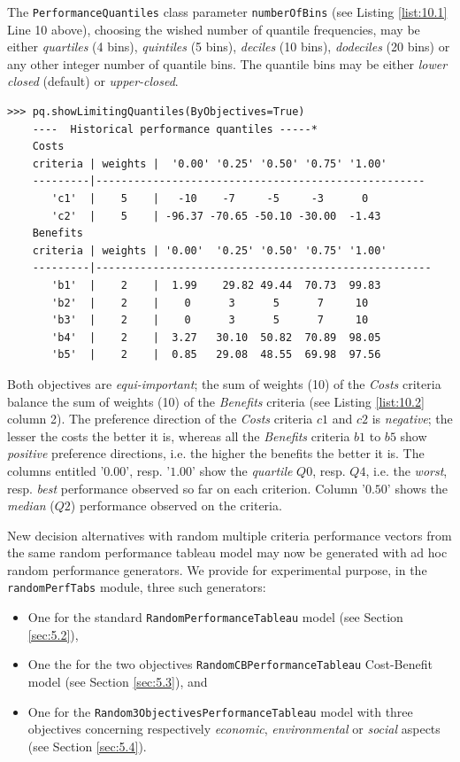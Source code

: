 The \texttt{PerformanceQuantiles} class parameter \texttt{numberOfBins} (see Listing \ref{list:10.1} Line 10 above), choosing the wished number of quantile frequencies, may be either \emph{quartiles} (4 bins), \emph{quintiles} (5 bins), \emph{deciles} (10 bins), \emph{dodeciles} (20 bins) or any other integer number of quantile bins. The quantile bins may be either \emph{lower closed} (default) or \emph{upper-closed}.

\begin{lstlisting}[caption={Printing out the estimated quartile limits},label=list:10.2]
>>> pq.showLimitingQuantiles(ByObjectives=True)
    ----  Historical performance quantiles -----*
    Costs
    criteria | weights |  '0.00' '0.25' '0.50' '0.75' '1.00'   
    ---------|----------------------------------------------------
       'c1'  |    5    |   -10    -7     -5     -3      0  
       'c2'  |    5    | -96.37 -70.65 -50.10 -30.00  -1.43  
    Benefits
    criteria | weights | '0.00'  '0.25' '0.50' '0.75' '1.00'   
    ---------|-----------------------------------------------------
       'b1'  |    2    |  1.99    29.82 49.44  70.73  99.83  
       'b2'  |    2    |    0      3      5      7     10  
       'b3'  |    2    |    0      3      5      7     10  
       'b4'  |    2    |  3.27   30.10  50.82  70.89  98.05  
       'b5'  |    2    |  0.85   29.08  48.55  69.98  97.56  
\end{lstlisting}

Both objectives are \emph{equi-important}; the sum of weights (10) of the \emph{Costs} criteria balance the sum of weights (10) of the \emph{Benefits} criteria (see Listing \ref{list:10.2} column 2). The preference direction of the \emph{Costs} criteria $c1$ and $c2$ is \emph{negative}; the lesser the costs the better it is, whereas all the \emph{Benefits} criteria $b1$ to $b5$ show \emph{positive} preference directions, i.e. the higher the benefits the better it is. The columns entitled '$0.00$', resp. '$1.00$' show the \emph{quartile} $Q0$, resp. $Q4$, i.e. the \emph{worst}, resp. \emph{best} performance observed so far on each criterion. Column '$0.50$' shows the \emph{median} ($Q2$) performance observed on the criteria.  

New  decision alternatives with random multiple criteria performance vectors from the same random performance tableau model may now be generated with ad hoc random performance generators. We provide for experimental purpose, in the \texttt{randomPerfTabs} module, three such generators:
\begin{itemize}
\item One for the standard \texttt{RandomPerformanceTableau} model (see Section \ref{sec:5.2}),
\item One the for the two objectives \texttt{RandomCBPerformanceTableau} Cost-Benefit model (see Section \ref{sec:5.3}), and
\item One for the \texttt{Random3ObjectivesPerformanceTableau} model with three objectives concerning respectively \emph{economic}, \emph{environmental} or \emph{social} aspects (see Section \ref{sec:5.4}).
\end{itemize}

